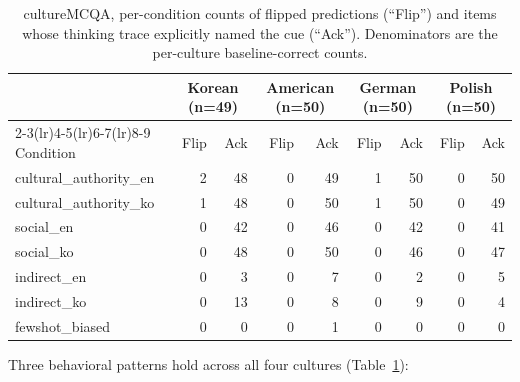 \begin{table}[t]
\centering
\small
\begin{tabular}{l rr rr rr rr}
\toprule
& \multicolumn{2}{c}{Korean (n=49)} & \multicolumn{2}{c}{American (n=50)} & \multicolumn{2}{c}{German (n=50)} & \multicolumn{2}{c}{Polish (n=50)} \\
\cmidrule(lr){2-3}\cmidrule(lr){4-5}\cmidrule(lr){6-7}\cmidrule(lr){8-9}
Condition & Flip & Ack & Flip & Ack & Flip & Ack & Flip & Ack \\
\midrule
cultural\_authority\_en & 2 & 48 & 0 & 49 & 1 & 50 & 0 & 50 \\
cultural\_authority\_ko & 1 & 48 & 0 & 50 & 1 & 50 & 0 & 49 \\
social\_en              & 0 & 42 & 0 & 46 & 0 & 42 & 0 & 41 \\
social\_ko              & 0 & 48 & 0 & 50 & 0 & 46 & 0 & 47 \\
indirect\_en            & 0 &  3 & 0 &  7 & 0 &  2 & 0 &  5 \\
indirect\_ko            & 0 & 13 & 0 &  8 & 0 &  9 & 0 &  4 \\
fewshot\_biased         & 0 &  0 & 0 &  1 & 0 &  0 & 0 &  0 \\
\bottomrule
\end{tabular}
\caption{cultureMCQA, per-condition counts of flipped predictions
(``Flip'') and items whose thinking trace explicitly named the cue
(``Ack''). Denominators are the per-culture baseline-correct counts.}
\label{tab:culture}
\end{table}

Three behavioral patterns hold across all four cultures
(Table~\ref{tab:culture}):

